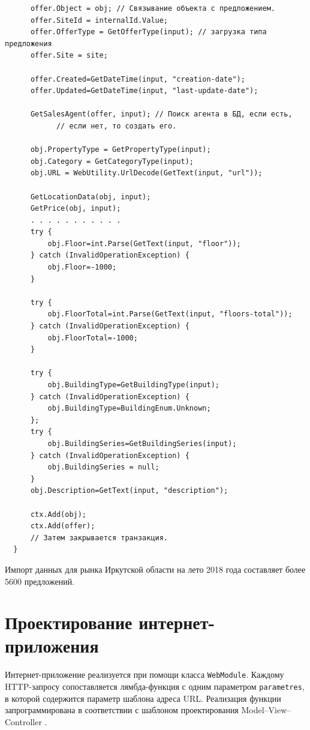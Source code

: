 \documentclass[a4paper,14pt,openany,final]{extreport} %
\begin{document}
{\begin{verbatim}
      offer.Object = obj; // Связывание объекта с предложением.
      offer.SiteId = internalId.Value;
      offer.OfferType = GetOfferType(input); // загрузка типа предложения
      offer.Site = site;

      offer.Created=GetDateTime(input, "creation-date");
      offer.Updated=GetDateTime(input, "last-update-date");

      GetSalesAgent(offer, input); // Поиск агента в БД, если есть,
            // если нет, то создать его.

      obj.PropertyType = GetPropertyType(input);
      obj.Category = GetCategoryType(input);
      obj.URL = WebUtility.UrlDecode(GetText(input, "url"));

      GetLocationData(obj, input);
      GetPrice(obj, input);
      . . . . . . . . . . .
      try {
          obj.Floor=int.Parse(GetText(input, "floor"));
      } catch (InvalidOperationException) {
          obj.Floor=-1000;
      }

      try {
          obj.FloorTotal=int.Parse(GetText(input, "floors-total"));
      } catch (InvalidOperationException) {
          obj.FloorTotal=-1000;
      }

      try {
          obj.BuildingType=GetBuildingType(input);
      } catch (InvalidOperationException) {
          obj.BuildingType=BuildingEnum.Unknown;
      };
      try {
          obj.BuildingSeries=GetBuildingSeries(input);
      } catch (InvalidOperationException) {
          obj.BuildingSeries = null;
      }
      obj.Description=GetText(input, "description");

      ctx.Add(obj);
      ctx.Add(offer);
      // Затем закрывается транзакция.
  }
\end{verbatim}
Импорт данных для рынка Иркутской области на лето 2018 года составляет более 5600 предложений.

\section{Проектирование интернет-приложения}

Интернет-приложение реализуется при помощи класса \verb|WebModule|. Каждому HTTP-запросу сопоставляется лямбда-функция с одним параметром \verb|parametres|, в которой содержится параметр шаблона адреса URL. Реализация функции запрограммирована в соответствии с шаблоном проектирования \foreignlanguage{english}{Model--View--Controller} \cite{mvc}.

}
\end{document}

